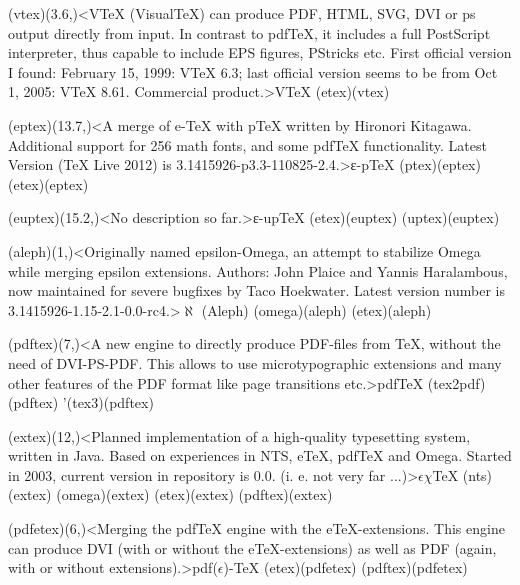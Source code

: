 {	\tonode[\experimental](vtex)(3.6,\layer)<VTeX (VisualTeX) can produce PDF, HTML, SVG, DVI or ps output directly from input. In contrast to pdfTeX, it includes a full PostScript interpreter, thus capable to include EPS figures, PStricks etc. First official version I found: February 15, 1999: VTeX 6.3; last official version seems to be from Oct 1, 2005: VTeX 8.61. Commercial product.>{V\TeX}
		\todraw(etex)(vtex)

	\steplayer[-1]

	\tonode(eptex)(13.7,\layer)<A merge of e-TeX with pTeX written by Hironori Kitagawa. Additional support for 256 math fonts, and some pdfTeX functionality. Latest Version (TeX Live 2012) is 3.1415926-p3.3-110825-2.4.>{ε-p\TeX}
		\todraw(ptex)(eptex)
		\todraw(etex)(eptex)

	\steplayer[-1.5]

	\tonode(euptex)(15.2,\layer)<No description so far.>{ε-up\TeX}
		\todraw(etex)(euptex)
		\todraw(uptex)(euptex)

	\steplayer[-.5]

	\tonode(aleph)(1,\layer)<Originally named epsilon-Omega, an attempt to stabilize Omega while merging epsilon extensions. Authors: John Plaice and Yannis Haralambous, now maintained for severe bugfixes by Taco Hoekwater. Latest version number is 3.1415926-1.15-2.1-0.0-rc4.>{$\aleph$ (Aleph)}
		\todraw(omega)(aleph)
		\todraw(etex)(aleph)
	
	\tonode[\vip](pdftex)(7,\layer)<A new engine to directly produce PDF-files from TeX, without the need of DVI-PS-PDF. This allows to use microtypographic extensions and many other features of the PDF format like page transitions etc.>{pdf\TeX}
		\todraw(tex2pdf)(pdftex)
		\todraw'(tex3)(pdftex)
	
	\steplayer[-1]

	\tonode[\experimental](extex)(12,\layer)<Planned implementation of a high-quality typesetting system, written in Java. Based on experiences in NTS, eTeX, pdfTeX and Omega. Started in 2003, current version in repository is 0.0. (i. e. not very far ...)>{$\epsilon\chi$\TeX}
		\todraw(nts)(extex)
		\todraw(omega)(extex)
		\todraw(etex)(extex)
		\todraw(pdftex)(extex)

	\steplayer[-1]
	
	\tonode[\vip](pdfetex)(6,\layer)<Merging the pdfTeX engine with the eTeX-extensions. This engine can produce DVI (with or without the eTeX-extensions) as well as PDF (again, with or without extensions).>{pdf($\epsilon$)-\TeX}
		\todraw*(etex)(pdfetex)
		\todraw*(pdftex)(pdfetex)

}
